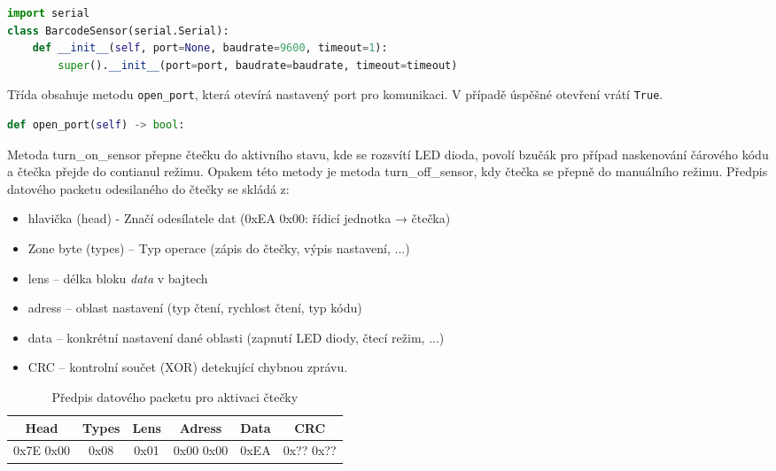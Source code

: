 \begin{lstlisting}[language=python,breaklines=true, frame=single]
import serial
class BarcodeSensor(serial.Serial):
    def __init__(self, port=None, baudrate=9600, timeout=1):
        super().__init__(port=port, baudrate=baudrate, timeout=timeout)
\end{lstlisting}
\bigskip
Třída obsahuje metodu \texttt{open\_port}, která otevírá nastavený port pro komunikaci. 
V případě úspěšné otevření vrátí \texttt{True}. 

\begin{lstlisting}[language=Python,breaklines=false, frame=single]
def open_port(self) -> bool:
\end{lstlisting}

\bigskip
Metoda turn\_on\_sensor přepne čtečku do aktivního stavu, kde se rozsvítí LED dioda, povolí bzučák pro případ naskenování čárového kódu a čtečka přejde do contianul režimu. Opakem této metody je metoda turn\_off\_sensor, kdy čtečka se přepně do manuálního režimu. Předpis datového packetu odesilaného do čtečky se skládá z:

\begin{itemize}
    \item hlavička (head) - Značí odesílatele dat (0xEA 0x00: řídicí jednotka → čtečka)
    \item Zone byte (types) – Typ operace (zápis do čtečky, výpis nastavení, ...)
    \item lens – délka bloku \textit{data} v bajtech
    \item adress – oblast nastavení (typ čtení, rychlost čtení, typ kódu)
    \item data – konkrétní nastavení dané oblasti (zapnutí LED diody, čtecí režim, ...)
    \item CRC – kontrolní součet (XOR) detekující chybnou zprávu. 
\end{itemize}

\begin{table}[H]
    \centering
    \begin{tabular}{|c|c|c|c|c|c|}
         \hline
         Head & Types & Lens & Adress & Data & CRC\\ \hline
         0x7E 0x00 & 0x08 & 0x01 & 0x00 0x00 & 0xEA & 0x?? 0x??\\
         \hline
    \end{tabular}
    \caption{Předpis datového packetu pro aktivaci čtečky}
    \label{tab:my_label}
\end{table}

